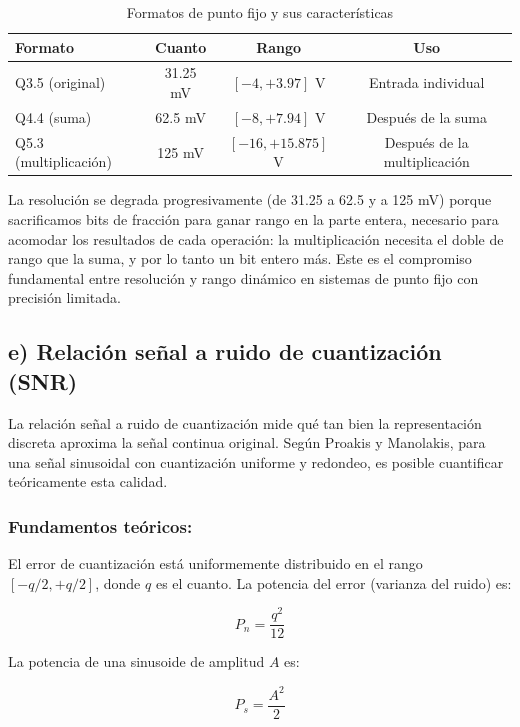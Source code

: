 \documentclass[12pt]{article}
\begin{document}
\begin{table}[H]
\centering
\begin{tabular}{lccc}
\toprule
\textbf{Formato} & \textbf{Cuanto} & \textbf{Rango} & \textbf{Uso} \\
\midrule
Q3.5 (original) & 31.25 mV & {$[-4, +3.97]$ V} & Entrada individual \\
Q4.4 (suma) & 62.5 mV & {$[-8, +7.94]$ V} & Después de la suma \\
Q5.3 (multiplicación) & 125 mV & {$[-16, +15.875]$ V} & Después de la multiplicación \\
\bottomrule
\end{tabular}
\caption{Formatos de punto fijo y sus características}
\end{table}

La resolución se degrada progresivamente (de 31.25 a 62.5 y a 125 mV) porque sacrificamos bits de fracción para ganar rango en la parte entera, necesario para acomodar los resultados de cada operación: la multiplicación necesita el doble de rango que la suma, y por lo tanto un bit entero más. Este es el compromiso fundamental entre resolución y rango dinámico en sistemas de punto fijo con precisión limitada.
 
\subsection*{e) Relación señal a ruido de cuantización (SNR)}
 
La relación señal a ruido de cuantización mide qué tan bien la representación discreta aproxima la señal continua original. Según Proakis y Manolakis, para una señal sinusoidal con cuantización uniforme y redondeo, es posible cuantificar teóricamente esta calidad.
 
\subsubsection*{Fundamentos teóricos:}
 
El error de cuantización está uniformemente distribuido en el rango $[-q/2, +q/2]$, donde $q$ es el cuanto. La potencia del error (varianza del ruido) es:
 
\begin{equation}
P_n = \frac{q^2}{12}
\end{equation}
 
La potencia de una sinusoide de amplitud $A$ es:
 
\begin{equation}
P_s = \frac{A^2}{2}
\end{equation}
 
\end{document}
